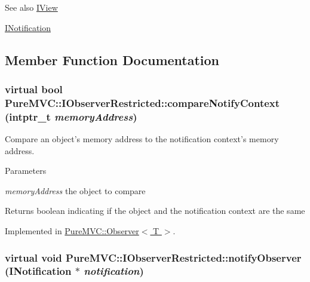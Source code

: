 \begin{DoxySeeAlso}{See also}
\hyperlink{class_pure_m_v_c_1_1_i_view}{IView} 

\hyperlink{class_pure_m_v_c_1_1_i_notification}{INotification} 
\end{DoxySeeAlso}


\subsection{Member Function Documentation}
\hypertarget{class_pure_m_v_c_1_1_i_observer_restricted_a773762b441d4944e77b5b53789a4c52b}{
\subsubsection[{compareNotifyContext}]{\setlength{\rightskip}{0pt plus 5cm}virtual bool PureMVC::IObserverRestricted::compareNotifyContext (intptr\_\-t {\em memoryAddress})}}
\label{class_pure_m_v_c_1_1_i_observer_restricted_a773762b441d4944e77b5b53789a4c52b}


Compare an object's memory address to the notification context's memory address. 
\begin{DoxyParams}{Parameters}
\item[{\em memoryAddress}]the object to compare \end{DoxyParams}
\begin{DoxyReturn}{Returns}
boolean indicating if the object and the notification context are the same 
\end{DoxyReturn}


Implemented in \hyperlink{class_pure_m_v_c_1_1_observer_a1b8be3d83deabe4c0c820af7821459a1}{PureMVC::Observer$<$ T $>$}.\hypertarget{class_pure_m_v_c_1_1_i_observer_restricted_a808a9378a31b068f285fe0b4446048e1}{
\subsubsection[{notifyObserver}]{\setlength{\rightskip}{0pt plus 5cm}virtual void PureMVC::IObserverRestricted::notifyObserver ({\bf INotification} $\ast$ {\em notification})}}
\label{class_pure_m_v_c_1_1_i_observer_restricted_a808a9378a31b068f285fe0b4446048e1}


